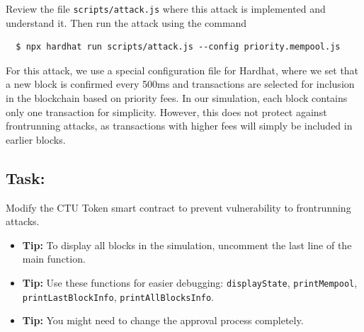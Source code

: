 \documentclass[12pt]{article}
\begin{document}
\medskip
\noindent
Review the file \texttt{scripts/attack.js} where this attack is implemented and understand it. Then run the attack using the command

\begin{verbatim}
  $ npx hardhat run scripts/attack.js --config priority.mempool.js
\end{verbatim}

For this attack, we use a special configuration file for Hardhat, where we set that a new block is confirmed every 500ms and transactions are selected for inclusion in the blockchain based on priority fees. In our simulation, each block contains only one transaction for simplicity. However, this does not protect against frontrunning attacks, as transactions with higher fees will simply be included in earlier blocks. 

\subsection*{Task:} Modify the CTU Token smart contract to prevent vulnerability to frontrunning attacks.

\begin{itemize}
  \item \textbf{Tip:} To display all blocks in the simulation, uncomment the last line of the main function.
  \item \textbf{Tip:} Use these functions for easier debugging: \texttt{displayState}, \texttt{printMempool}, \texttt{printLastBlockInfo}, \texttt{printAllBlocksInfo}.
  \item \textbf{Tip:} You might need to change the approval process completely.
\end{itemize}
\end{document}
